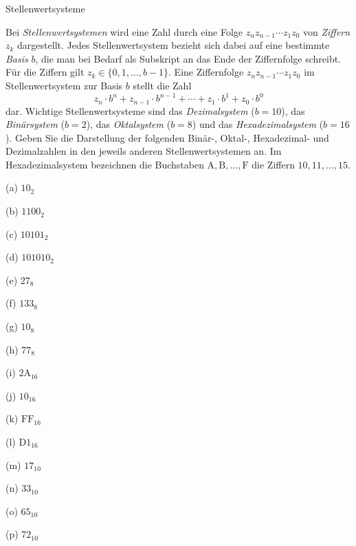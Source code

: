 
\begin{exercise}{Stellenwertsysteme}
\begin{body}
Bei \emph{Stellenwertsystemen} wird eine Zahl durch eine Folge ${z_n z_{n-1} \dotsb z_1 z_0}$ von \emph{Ziffern} $z_k$ dargestellt. Jedes Stellenwertsystem bezieht sich dabei auf eine bestimmte \emph{Basis} $b$, die man bei Bedarf als Subskript an das Ende der Ziffernfolge schreibt. Für die Ziffern gilt $z_k \in \{0,1,\dotsc,b-1\}$. Eine Ziffernfolge
${z_n z_{n-1} \dotsb z_1 z_0}$ im Stellenwertsystem zur Basis $b$ stellt die Zahl
\[  z_n \cdot b^{n} + z_{n-1} \cdot b^{n-1} + \dotsb + z_1 \cdot b^1 + z_0 \cdot b^0  \]
dar. Wichtige Stellenwertsysteme sind das \emph{Dezimalsystem} ($b = 10$), das \emph{Binärsystem} ($b = 2$), das \emph{Oktalsystem} ($b = 8$) und das \emph{Hexadezimalsystem} ($b = 16$). Geben Sie die Darstellung der folgenden  Binär-, Oktal-, Hexadezimal- und Dezimalzahlen in den jeweils anderen Stellenwertsystemen an. Im Hexadezimalsystem bezeichnen die Buchstaben $\mathrm{A},\mathrm{B}, \dotsc, \mathrm{F}$ die Ziffern $10, 11, \dotsc, 15$.
\begin{center}
\begin{minipage}{0.22\textwidth}
\begin{parts}
\item[(a)] $10_2$
\item[(b)] $1100_2$
\item[(c)] $10101_2$
\item[(d)] $101010_2$
\end{parts}
\end{minipage}
\begin{minipage}{0.22\textwidth}
\begin{parts}
\item[(e)] $27_8$
\item[(f)] $133_8$
\item[(g)] $10_8$
\item[(h)] $77_8$
\end{parts}
\end{minipage}
\begin{minipage}{0.22\textwidth}
\begin{parts}
\item[(i)] $\mathrm{2A}_{16}$
\item[(j)] $10_{16}$
\item[(k)] $\mathrm{FF}_{16}$
\item[(l)] $\mathrm{D1}_{16}$
\end{parts}
\end{minipage}
\begin{minipage}{0.22\textwidth}
\begin{parts}
\item[(m)] $17_{10}$
\item[(n)] $33_{10}$
\item[(o)] $65_{10}$
\item[(p)] $72_{10}$
\end{parts}
\end{minipage}
\end{center}
\end{body}



\end{exercise}
